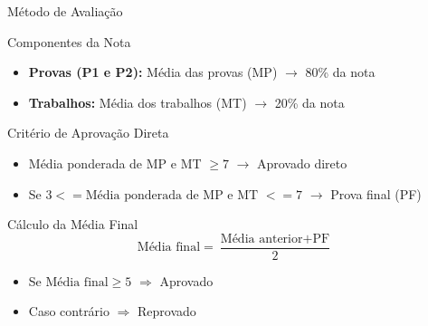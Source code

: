 \begin{frame}{Método de Avaliação}
  \begin{block}{Componentes da Nota}
    \begin{itemize}
      \item \textbf{Provas (P1 e P2):}  
  Média das provas (MP) $\rightarrow$ 80\% da nota
      \item \textbf{Trabalhos:} 
  Média dos trabalhos (MT) $\rightarrow$ 20\% da nota 
    \end{itemize}
  \end{block}

  \begin{block}{Critério de Aprovação Direta}
    \begin{itemize}
      \item Média ponderada de MP e MT $\geq 7$ 
      \hspace{1em} $\rightarrow$ Aprovado direto
      \item Se $3 <= \text{Média ponderada de MP e MT } <= 7$ 
      \hspace{1em} $\rightarrow$ Prova final (PF)
    \end{itemize}
  \end{block}

  \begin{block}{Cálculo da Média Final}
    \[
      \text{Média final} = \frac{\text{Média anterior} + \text{PF}}{2}
    \]
    \begin{itemize}
      \item Se $\text{Média final} \geq 5$ $\Rightarrow$ Aprovado
      \item Caso contrário $\Rightarrow$ Reprovado
    \end{itemize}
  \end{block}
\end{frame}


